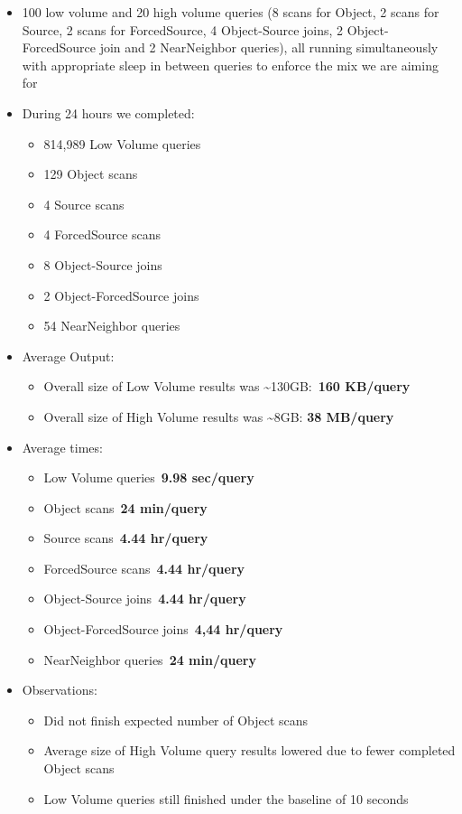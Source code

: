 \documentclass[DM,toc]{lsstdoc}
\begin{document}
\begin{itemize}
\item
  100 low volume and 20 high volume queries (8 scans for Object, 2 scans
  for Source, 2 scans for ForcedSource, 4 Object-Source joins, 2
  Object-ForcedSource join and 2 NearNeighbor queries), all running
  simultaneously with appropriate sleep in between queries to enforce
  the mix we are aiming for
\item
  During 24 hours we completed:

  \begin{itemize}
  \item
    814,989 Low Volume queries
  \item
    129 Object scans
  \item
    4 Source scans
  \item
    4 ForcedSource scans
  \item
    8 Object-Source joins
  \item
    2 Object-ForcedSource joins
  \item
    54 NearNeighbor queries
  \end{itemize}
\item
  Average Output:

  \begin{itemize}
  \item
    Overall size of Low Volume results was
    \textasciitilde{}130GB:~\textbf{160 KB/query}
  \item
    Overall size of High Volume results was \textasciitilde{}8GB:
    \textbf{38 MB/query}
  \end{itemize}
\item
  Average times:

  \begin{itemize}
  \item
    Low Volume queries~\textbf{9.98 sec/query}
  \item
    Object scans~\textbf{24 min/query}
  \item
    Source scans~\textbf{4.44 hr/query}
  \item
    ForcedSource scans~\textbf{4.44 hr/query}
  \item
    Object-Source joins~\textbf{4.44 hr/query}
  \item
    Object-ForcedSource joins~\textbf{4,44 hr/query}
  \item
    NearNeighbor queries~\textbf{24 min/query}
  \end{itemize}
\item
  Observations:

  \begin{itemize}
  \item
    Did not finish expected number of Object scans
  \item
    Average size of High Volume query results lowered due to fewer
    completed Object scans
  \item
    Low Volume queries still finished under the baseline of 10 seconds
  \end{itemize}
\end{itemize}
\end{document}

